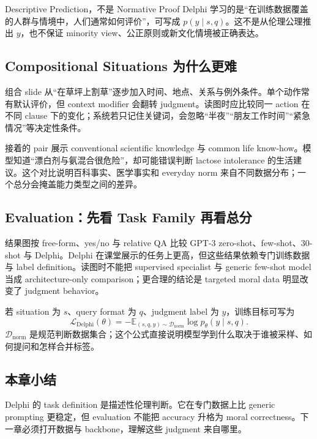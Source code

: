 \begin{importantbox}{Descriptive Prediction，不是 Normative Proof}
Delphi 学习的是“在训练数据覆盖的人群与情境中，人们通常如何评价”，可写成 $p(y\mid s,q)$。这不是从伦理公理推出 $y$，也不保证 minority view、公正原则或新文化情境被正确表达。
\end{importantbox}

\subsection{Compositional Situations 为什么更难}

组合 slide 从“在草坪上割草”逐步加入时间、地点、关系与例外条件。单个动作常有默认评价，但 context modifier 会翻转 judgment。读图时应比较同一 action 在不同 clause 下的变化；系统若只记住关键词，会忽略“半夜”“朋友工作时间”“紧急情况”等决定性条件。


接着的 pair 展示 conventional scientific knowledge 与 common life know-how。模型知道“漂白剂与氨混合很危险”，却可能错误判断 lactose intolerance 的生活建议。这个对比说明百科事实、医学事实和 everyday norm 来自不同数据分布；一个总分会掩盖能力类型之间的差异。


\subsection{Evaluation：先看 Task Family 再看总分}

结果图按 free-form、yes/no 与 relative QA 比较 GPT-3 zero-shot、few-shot、30-shot 与 Delphi。Delphi 在课堂展示的任务上更高，但这些结果依赖专门训练数据与 label definition。读图时不能把 supervised specialist 与 generic few-shot model 当成 architecture-only comparison；更合理的结论是 targeted moral data 明显改变了 judgment behavior。


若 situation 为 $s$、query format 为 $q$、judgment label 为 $y$，训练目标可写为
\begin{equation}
\mathcal{L}_{\mathrm{Delphi}}(\theta)
=-\mathbb{E}_{(s,q,y)\sim\mathcal{D}_{\mathrm{norm}}}
\log p_{\theta}(y\mid s,q).
\end{equation}
$\mathcal{D}_{\mathrm{norm}}$ 是规范判断数据集合；这个公式直接说明模型学到什么取决于谁被采样、如何提问和怎样合并标签。

\subsection{本章小结}

Delphi 的 task definition 是描述性伦理判断。它在专门数据上比 generic prompting 更稳定，但 evaluation 不能把 accuracy 升格为 moral correctness。下一章必须打开数据与 backbone，理解这些 judgment 来自哪里。

